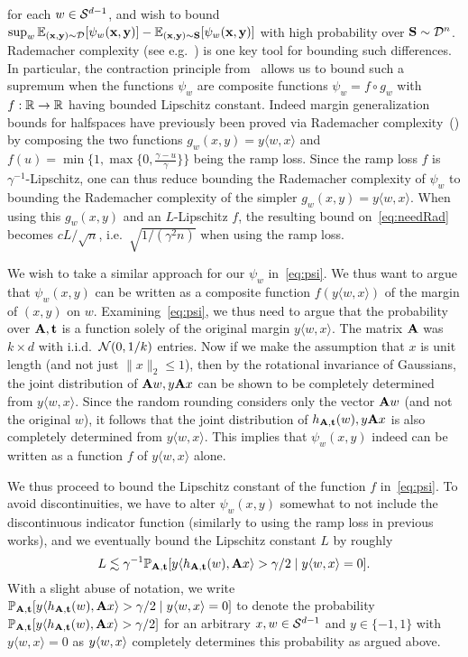 for each $w \in \mathcal{S}^{d-1}$, and wish to bound $\sup_w \mathbb{E}_{(\mathbf{x},\mathbf{y}) \sim \mathcal{D}}[\psi_w(\mathbf{x},\mathbf{y})] - \mathbb{E}_{(\mathbf{x},\mathbf{y}) \sim \mathbf{S}}[\psi_w(\mathbf{x},\mathbf{y})]$ with high probability over $\mathbf{S} \sim \mathcal{D}^n$. Rademacher complexity (see e.g.~\cite{rademacherbound}) is one key tool for bounding such differences. In particular, the contraction principle from~\cite{ledoux1991probability} allows us to bound such a supremum when the functions $\psi_w$ are composite functions $\psi_w = f \circ g_w$ with $f : \mathbb{R} \to \mathbb{R}$ having bounded Lipschitz constant. Indeed margin generalization bounds for halfspaces have previously been proved via Rademacher complexity~(\cite{DBLP:journals/jmlr/BartlettM02}) by composing the two functions $g_w(x,y) = y \langle w, x\rangle$ and $f(u) = \min\{1, \max\{0,\frac{\gamma-u}{\gamma}\}\}$ being the ramp loss. Since the ramp loss $f$ is $\gamma^{-1}$-Lipschitz, one can thus reduce bounding the Rademacher complexity of $\psi_w$ to bounding the Rademacher complexity of the simpler $g_w(x,y) = y\langle w ,x\rangle$. When using this $g_w(x,y)$ and an $L$-Lipschitz $f$, the resulting bound on~\eqref{eq:needRad} becomes $c L/\sqrt{n}$, i.e.\ $\sqrt{1/(\gamma^2 n)}$ when using the ramp loss.

We wish to take a similar approach for our $\psi_w$ in~\eqref{eq:psi}. We thus want to argue that $\psi_w(x,y)$ can be written as a composite function $f(y\langle w, x\rangle)$ of the margin of $(x,y)$ on $w$. Examining~\eqref{eq:psi}, we thus need to argue that the probability over $\mathbf{A},\mathbf{t}$ is a function solely of the original margin $y \langle w, x\rangle$. The matrix $\mathbf{A}$ was $k \times d$ with i.i.d.\ $\mathcal{N}(0,1/k)$ entries. Now if we make the assumption that $x$ is unit length (and not just $\|x\|_2 \leq 1$), then by the rotational invariance of Gaussians, the joint distribution of $\mathbf{A} w, y\mathbf{A} x$ can be shown to be completely determined from $y \langle w, x\rangle$. Since the random rounding considers only the vector $\mathbf{A} w$ (and not the original $w$), it follows that the joint distribution of $h_{\mathbf{A},\mathbf{t}}(w), y \mathbf{A} x$ is also completely determined from $y \langle w, x\rangle$. This implies that $\psi_w(x,y)$ indeed can be written as a function $f$ of $y \langle w, x\rangle$ alone. 

We thus proceed to bound the Lipschitz constant of the function $f$ in~\eqref{eq:psi}. To avoid discontinuities, we have to alter $\psi_w(x,y)$ somewhat to not include the discontinuous indicator function (similarly to using the ramp loss in previous works), and we eventually bound the Lipschitz constant $L$ by roughly
\[
L \lesssim \gamma^{-1} \mathbb{P}_{\mathbf{A},\mathbf{t}}[y \langle h_{\mathbf{A},\mathbf{t}}(w),\mathbf{A} x\rangle > \gamma/2 \mid y \langle w, x\rangle = 0].
\]
With a slight abuse of notation, we write $\mathbb{P}_{\mathbf{A},\mathbf{t}}[y \langle h_{\mathbf{A},\mathbf{t}}(w),\mathbf{A} x\rangle > \gamma/2 \mid y \langle w, x\rangle = 0]$ to denote the probability $\mathbb{P}_{\mathbf{A},\mathbf{t}}[y \langle h_{\mathbf{A},\mathbf{t}}(w),\mathbf{A} x\rangle > \gamma/2]$ for an arbitrary $x,w \in \mathcal{S}^{d-1}$ and $y \in \{-1,1\}$ with $y\langle w,x\rangle = 0$ as $y\langle w,x\rangle$ completely determines this probability as argued above.

